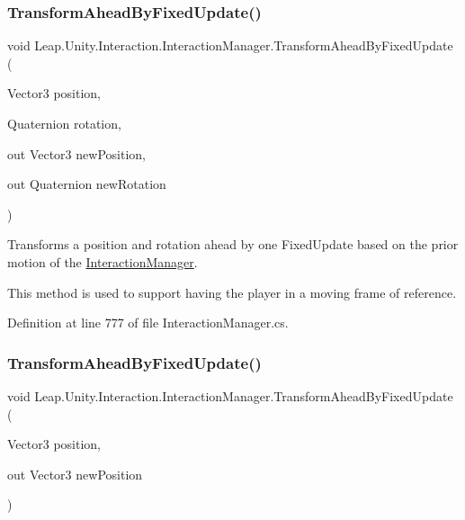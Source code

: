 \subsubsection{\texorpdfstring{TransformAheadByFixedUpdate()}{TransformAheadByFixedUpdate()}\hspace{0.1cm}{\footnotesize\ttfamily [1/2]}}
{\footnotesize\ttfamily void Leap.\+Unity.\+Interaction.\+Interaction\+Manager.\+Transform\+Ahead\+By\+Fixed\+Update (\begin{DoxyParamCaption}\item[{Vector3}]{position,  }\item[{Quaternion}]{rotation,  }\item[{out Vector3}]{new\+Position,  }\item[{out Quaternion}]{new\+Rotation }\end{DoxyParamCaption})}



Transforms a position and rotation ahead by one Fixed\+Update based on the prior motion of the \mbox{\hyperlink{class_leap_1_1_unity_1_1_interaction_1_1_interaction_manager}{Interaction\+Manager}}. 

This method is used to support having the player in a moving frame of reference. 

Definition at line 777 of file Interaction\+Manager.\+cs.

\mbox{\label{class_leap_1_1_unity_1_1_interaction_1_1_interaction_manager_a930a2c30dd330b50d86b1ead4eda9a0a}} 
\subsubsection{\texorpdfstring{TransformAheadByFixedUpdate()}{TransformAheadByFixedUpdate()}\hspace{0.1cm}{\footnotesize\ttfamily [2/2]}}
{\footnotesize\ttfamily void Leap.\+Unity.\+Interaction.\+Interaction\+Manager.\+Transform\+Ahead\+By\+Fixed\+Update (\begin{DoxyParamCaption}\item[{Vector3}]{position,  }\item[{out Vector3}]{new\+Position }\end{DoxyParamCaption})}



